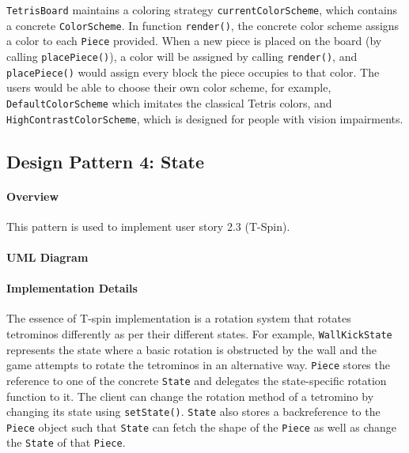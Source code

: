 \documentclass{article}
\begin{document}
\verb`TetrisBoard` maintains a coloring strategy \verb`currentColorScheme`, which contains a concrete
\verb`ColorScheme`. In function \verb`render()`, the concrete color scheme assigns a color to each \verb`Piece` provided. When a new piece is placed on the board (by calling \verb`placePiece()`), a color will be assigned by calling \verb`render()`, and \verb`placePiece()` would assign every block the piece occupies to that color. The users would be able to choose their own color scheme, for example, \verb`DefaultColorScheme` which imitates the classical Tetris colors, and \verb`HighContrastColorScheme`, which is designed for people with vision impairments.

\clearpage

\subsection{Design Pattern 4: State}

\paragraph{Overview}
This pattern is used to implement user story 2.3 (T-Spin).

\paragraph{UML Diagram}\hfill

\begin{figure}[H]
    
\end{figure}

\paragraph{Implementation Details}

The essence of T-spin implementation is a rotation system that rotates tetrominos differently as per their different states. For example, \verb`WallKickState` represents the state where a basic rotation is obstructed by the wall and the game attempts to rotate the tetrominos in an alternative way. \verb`Piece` stores the reference to one of the concrete \verb`State` and delegates the state-specific rotation function to it. The client can change the rotation method of a tetromino by changing its state using \verb`setState()`. \verb`State` also stores a backreference to the \verb`Piece` object such that \verb`State` can fetch the shape of the \verb`Piece` as well as change the \verb`State` of that \verb`Piece`.
\end{document}
